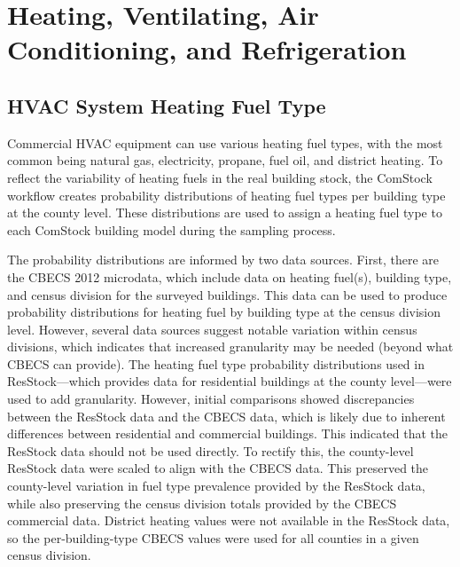 \section{Heating, Ventilating, Air Conditioning, and Refrigeration}
\label{sec:HVAC_System_Type_Heating_Fuel_Type}

\subsection{HVAC System Heating Fuel Type}

Commercial HVAC equipment can use various heating fuel types, with the most common being natural gas, electricity, propane, fuel oil, and district heating. To reflect the variability of heating fuels in the real building stock, the ComStock workflow creates probability distributions of heating fuel types per building type at the county level. These distributions are used to assign a heating fuel type to each ComStock building model during the sampling process.

The probability distributions are informed by two data sources. First, there are the CBECS 2012 microdata, which include data on heating fuel(s), building type, and census division for the surveyed buildings. This data can be used to produce probability distributions for heating fuel by building type at the census division level. However, several data sources suggest notable variation within census divisions, which indicates that increased granularity may be needed (beyond what CBECS can provide). The heating fuel type probability distributions used in ResStock---which provides data for residential buildings at the county level---were used to add granularity. However, initial comparisons showed discrepancies between the ResStock data and the CBECS data, which is likely due to inherent differences between residential and commercial buildings. This indicated that the ResStock data should not be used directly. To rectify this, the county-level ResStock data were scaled to align with the CBECS data. This preserved the county-level variation in fuel type prevalence provided by the ResStock data, while also preserving the census division totals provided by the CBECS commercial data. District heating values were not available in the ResStock data, so the per-building-type CBECS values were used for all counties in a given census division.

